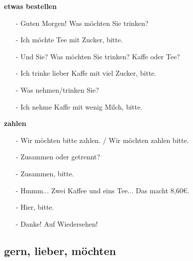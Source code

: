             \begin{multicols}{2}
                \textbf{etwas bestellen}
                \begin{itemize}[before=\renewcommand{\baselinestretch}{1},topsep=0pt,itemsep=4pt,parsep=0pt]
                    \item[-]  Guten Morgen! Was möchten Sie trinken?
                    \item[-]  Ich möchte Tee mit Zucker, bitte.
                    \item[-]  Und Sie? Was möchten Sie trinken? Kaffe oder Tee?
                    \item[-]  Ich trinke lieber Kaffe mit viel Zucker, bitte.
                    \item[-]  Was nehmen/trinken Sie?
                    \item[-]  Ich nehme Kaffe mit wenig Milch, bitte.
                \end{itemize}
            \vfill\null
            \columnbreak
                \textbf{zahlen}
                \begin{itemize}[before=\renewcommand{\baselinestretch}{1},topsep=0pt,itemsep=4pt,parsep=0pt]
                    \item[-]  Wir möchten bitte zahlen. / Wir möchten zahlen bitte. 
                    \item[-]  Zusammen oder getrennt?
                    \item[-]  Zusammen, bitte.
                    \item[-]  Hmmm... Zwei Kaffee und eins Tee... Das macht 8,60\euro.
                    \item[-]  Hier, bitte.
                    \item[-]  Danke! Auf Wiedersehen!
                \end{itemize}
            \vfill\null
            \end{multicols}

        \subsection{gern, lieber, möchten}\label{subsection:deutsch:im_cafe:gern_lieber_mochten}

